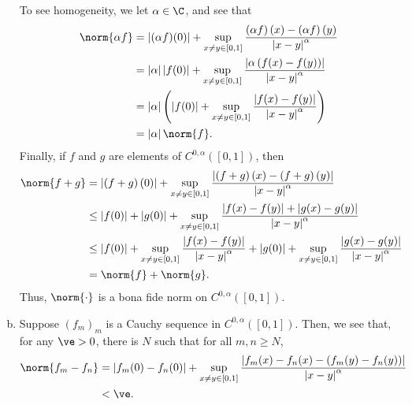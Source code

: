 \documentclass[10pt]{mypackage}
\begin{document}
\begin{enumerate}[(a)]
    To see homogeneity, we let $\alpha\in \C$, and see that
    \begin{align*}
      \norm{\alpha f} &= \left\vert (\alpha f)(0) \right\vert + \sup_{x\neq y\in [0,1]} \frac{\left( \alpha f \right)(x) - \left( \alpha f \right)(y)}{\left\vert x-y \right\vert^{\alpha}}\\
                      &= \left\vert \alpha \right\vert\left\vert f(0) \right\vert + \sup_{x\neq y\in [0,1]} \frac{\left\vert \alpha \left( f(x)-f(y) \right) \right\vert}{\left\vert x-y \right\vert^{\alpha}}\\
                      &= \left\vert \alpha \right\vert \left( \left\vert f(0) \right\vert + \sup_{x\neq y\in [0,1]} \frac{\left\vert f(x)-f(y) \right\vert}{\left\vert x-y \right\vert^{\alpha}} \right)\\
                      &= \left\vert \alpha \right\vert\norm{f}.
    \end{align*}
    Finally, if $f$ and $g$ are elements of $C^{0,\alpha}\left( [0,1] \right)$, then
    \begin{align*}
      \norm{f+g} &= \left\vert \left( f+g \right)(0) \right\vert + \sup_{x\neq y\in [0,1]} \frac{\left\vert \left( f+g \right)(x) - \left( f+g \right)(y) \right\vert}{\left\vert x-y \right\vert^{\alpha}}\\
                 &\leq \left\vert f(0) \right\vert + \left\vert g(0) \right\vert + \sup_{x\neq y\in [0,1]} \frac{\left\vert f(x)-f(y) \right\vert + \left\vert g(x)-g(y) \right\vert}{\left\vert x-y \right\vert^{\alpha}}\\
                 &\leq \left\vert f(0) \right\vert + \sup_{x\neq y\in [0,1]} \frac{\left\vert f(x)-f(y) \right\vert}{\left\vert x-y \right\vert^{\alpha}} + \left\vert g(0) \right\vert + \sup_{x\neq y\in [0,1]} \frac{\left\vert g(x)-g(y) \right\vert}{\left\vert x-y \right\vert^{\alpha}}\\
                 &= \norm{f} + \norm{g}.
    \end{align*}
    Thus, $\norm{\cdot}$ is a bona fide norm on $C^{0,\alpha}\left( \left[ 0,1 \right] \right)$.
  \item Suppose $\left( f_m \right)_m$ is a Cauchy sequence in $C^{0,\alpha}\left( [0,1] \right)$. Then, we see that, for any $\ve > 0$, there is $N$ such that for all $m,n\geq N$,
    \begin{align*}
      \norm{f_m-f_n} &= \left\vert f_m(0)-f_n(0) \right\vert + \sup_{x\neq y\in [0,1]} \frac{\left\vert f_m(x) - f_n(x) - \left( f_m(y) - f_n(y) \right) \right\vert}{\left\vert x-y \right\vert^{\alpha}}\\
                     &< \ve.
    \end{align*}
\end{enumerate}
\end{document}
